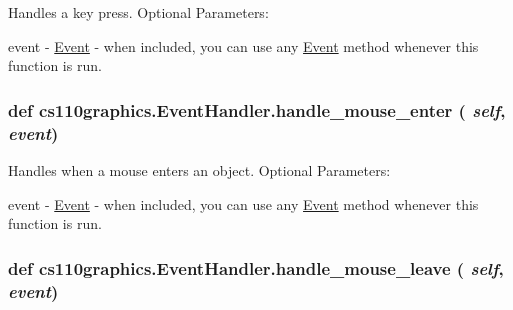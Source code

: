Handles a key press. Optional Parameters:
\begin{DoxyItemize}
\item event -\/ \hyperlink{classcs110graphics_1_1Event}{Event} -\/ when included, you can use any \hyperlink{classcs110graphics_1_1Event}{Event} method whenever this function is run. 
\end{DoxyItemize}\hypertarget{classcs110graphics_1_1EventHandler_a13af3268f8a1aa36b8483eb2deffef15}{
\subsubsection[{handle\_\-mouse\_\-enter}]{\setlength{\rightskip}{0pt plus 5cm}def cs110graphics.EventHandler.handle\_\-mouse\_\-enter ( {\em self}, \/   {\em event})}}
\label{classcs110graphics_1_1EventHandler_a13af3268f8a1aa36b8483eb2deffef15}


Handles when a mouse enters an object. Optional Parameters:
\begin{DoxyItemize}
\item event -\/ \hyperlink{classcs110graphics_1_1Event}{Event} -\/ when included, you can use any \hyperlink{classcs110graphics_1_1Event}{Event} method whenever this function is run. 
\end{DoxyItemize}\hypertarget{classcs110graphics_1_1EventHandler_a5deaf2b6b8055e97ac0ddf6603132c64}{
\subsubsection[{handle\_\-mouse\_\-leave}]{\setlength{\rightskip}{0pt plus 5cm}def cs110graphics.EventHandler.handle\_\-mouse\_\-leave ( {\em self}, \/   {\em event})}}
\label{classcs110graphics_1_1EventHandler_a5deaf2b6b8055e97ac0ddf6603132c64}



